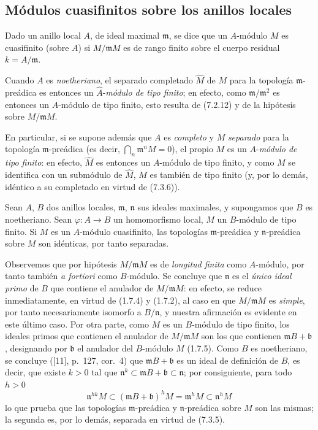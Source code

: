\subsection{Módulos cuasifinitos sobre los anillos locales}
\label{subsection:0.7.4-fr}

\begin{definition}[7.4.1]
\label{0.7.4.1-fr}
Dado un anillo local $A$, de ideal maximal $\mathfrak m$, se dice que un
$A$-módulo $M$ es cuasifinito (sobre $A$) si $M/\mathfrak mM$ es de rango finito
sobre el cuerpo residual $k=A/\mathfrak m$.
\end{definition}

Cuando $A$ es \emph{noetheriano}, el separado completado $\widehat M$ de $M$ para la
topología $\mathfrak m$-preádica es entonces un
$\widehat A$-\emph{módulo de tipo finito}; en efecto, como
$\mathfrak m/\mathfrak m^2$ es entonces un $A$-módulo de tipo finito, esto resulta
de (7.2.12) y de la hipótesis sobre $M/\mathfrak mM$.

En particular, si se supone además que $A$ es \emph{completo} y $M$
\emph{separado} para la topología $\mathfrak m$-preádica (es decir,
$\bigcap_n\mathfrak m^nM=0$), el propio $M$ es un
$A$-\emph{módulo de tipo finito}: en efecto, $\widehat M$ es entonces un
$A$-módulo de tipo finito, y como $M$ se identifica con un submódulo de
$\widehat M$, $M$ es también de tipo finito (y, por lo demás, idéntico a su
completado en virtud de (7.3.6)).

\begin{proposition}[7.4.2]
\label{0.7.4.2-fr}
Sean $A$, $B$ dos anillos locales, $\mathfrak m$, $\mathfrak n$ sus ideales
maximales, y supongamos que $B$ es noetheriano. Sean $\varphi:A\to B$ un
homomorfismo local, $M$ un $B$-módulo de tipo finito. Si $M$ es un $A$-módulo
cuasifinito, las topologías $\mathfrak m$-preádica y $\mathfrak n$-preádica
sobre $M$ son idénticas, por tanto separadas.
\end{proposition}

Observemos que por hipótesis $M/\mathfrak mM$ es de \emph{longitud finita}
como $A$-módulo, por tanto también \emph{a fortiori} como $B$-módulo. Se
concluye que $\mathfrak n$ es el \emph{único ideal primo} de $B$ que contiene
el anulador de $M/\mathfrak mM$: en efecto, se reduce inmediatamente, en virtud
de (1.7.4) y (1.7.2), al caso en que $M/\mathfrak mM$ es \emph{simple}, por tanto
necesariamente isomorfo a $B/\mathfrak n$, y nuestra afirmación es evidente
en este último caso. Por otra parte, como $M$ es un $B$-módulo de tipo finito,
los ideales primos que contienen el anulador de $M/\mathfrak mM$ son los
que contienen $\mathfrak mB+\mathfrak b$, designando por $\mathfrak b$
el anulador del $B$-módulo $M$ (1.7.5). Como $B$ es noetheriano, se concluye
([11], p.~127, cor.~4) que $\mathfrak mB+\mathfrak b$ es un ideal
de definición de $B$, es decir, que existe $k>0$ tal que
$\mathfrak n^k\subset\mathfrak mB+\mathfrak b\subset\mathfrak n$; por consiguiente,
para todo $h>0$
\[
  \mathfrak n^{hk}M
  \subset(\mathfrak mB+\mathfrak b)^hM
  =\mathfrak m^hM
  \subset\mathfrak n^hM
\]
lo que prueba que las topologías $\mathfrak m$-preádica y
$\mathfrak n$-preádica sobre $M$ son las mismas; la segunda es, por lo demás,
separada en virtud de (7.3.5).


